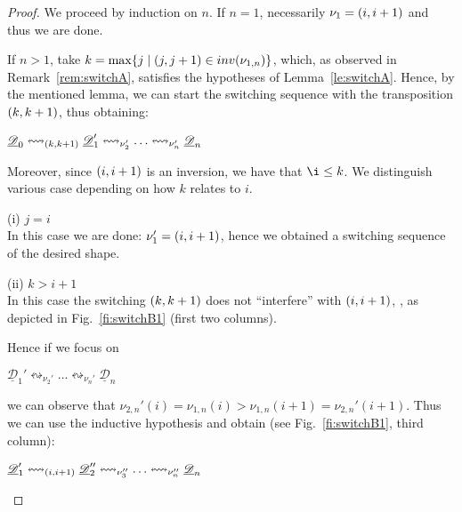 \documentclass[a4paper,UKenglish,cleveref,pdftex,thm-restate,numberwithinsect,anonymous]{lipics}
\newcommand{\dder}[1]{\mathscr{#1}}
\newcommand{\der}[1]{\underline{\dder{#1}}}
\newcommand{\inv}[1]{\mathsf{inv}({#1})}
\newcommand{\shift}[1]{\ensuremath{\mathrel{{\leftrightsquigarrow}_{#1}}}}
\begin{document}
\begin{proof}
  We proceed by induction on $n$. If $n=1$, necessarily
  $\nu_1 =  \transp{i}$ and thus we are done.

  If $n>1$, take $k = \max \{j \mid \transp{j} \in \inv{\nu_{1,n}}\}$, which,
  as observed in Remark~\ref{rem:switchA}, satisfies the hypotheses of
  Lemma~\ref{le:switchA}. Hence, by the mentioned lemma, we can start
  the switching sequence with the transposition $\transp{k}$, thus
  obtaining:
  \begin{center}
    $\der{D}_0 \shift{\transp{k}} \der{D}_1' \shift{\nu_2'} \ldots
    \shift{\nu_n'} \der{D}_n$
  \end{center}

  Moreover, since $\transp{i}$ is an inversion, we have that
  $\i \leq k$.  We distinguish various case depending on how $k$
  relates to $i$.

  \bigskip
  \noindent
  (i) $j=i$\\
  In this case we are done: $\nu_1' = \transp{i}$, hence we obtained a
  switching sequence of the desired shape.

  \bigskip
  \noindent
  (ii) $k > i+1$\\
  In this case the switching $\transp{k}$ does not ``interfere'' with
  $\transp{i}$, , as depicted in Fig.~\ref{fi:switchB1} (first two
  columns).

  Hence if we focus on
  \begin{center}
    $\der{D}_1' \shift{\nu_2'} \ldots
    \shift{\nu_n'} \der{D}_n$
  \end{center}
  we can observe that
  $\nu_{2,n}'(i)=\nu_{1,n}(i) > \nu_{1,n}(i+1)=\nu_{2,n}'(i+1)$.
  Thus we can use the inductive hypothesis and obtain (see
  Fig.~\ref{fi:switchB1}, third column):
  \begin{center}
    $\der{D}_1' \shift{\transp{i}} \der{D}_2'' \shift{\nu_3''} \ldots
    \shift{\nu_n''} \der{D}_n$
  \end{center}

\begin{figure}
  \centering
\end{figure}
\end{proof}
\end{document}
